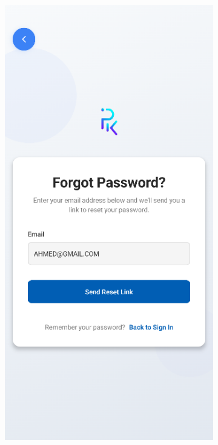 \begin{figure}[htbp]
    \vspace{0.5cm} %
    
    \begin{subfigure}[b]{0.3\textwidth}
        \centering
        \includegraphics[width=\textwidth]{images/mobile-auth-screen_forgetpassword.png}

\end{subfigure}
\end{figure}
